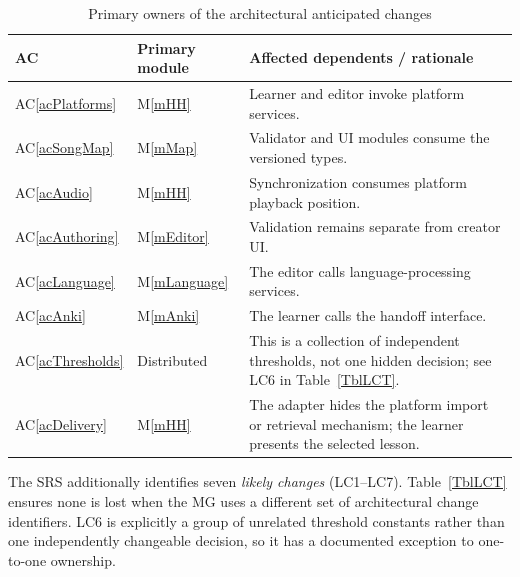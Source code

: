 \documentclass[12pt, titlepage]{article}
\newcommand{\acref}[1]{AC\ref{#1}}
\newcommand{\mref}[1]{M\ref{#1}}
\begin{document}
\begin{table}[H]
\centering
\begin{tabularx}{\textwidth}{@{}l l X@{}}
\toprule
\textbf{AC} & \textbf{Primary module} & \textbf{Affected dependents / rationale}\\
\midrule
\acref{acPlatforms} & \mref{mHH} & Learner and editor invoke platform services.\\
\acref{acSongMap} & \mref{mMap} & Validator and UI modules consume the versioned types.\\
\acref{acAudio} & \mref{mHH} & Synchronization consumes platform playback position.\\
\acref{acAuthoring} & \mref{mEditor} & Validation remains separate from creator UI.\\
\acref{acLanguage} & \mref{mLanguage} & The editor calls language-processing services.\\
\acref{acAnki} & \mref{mAnki} & The learner calls the handoff interface.\\
\acref{acThresholds} & Distributed & This is a collection of independent
  thresholds, not one hidden decision; see LC6 in Table~\ref{TblLCT}.\\
\acref{acDelivery} & \mref{mHH} & The adapter hides the platform import or
  retrieval mechanism; the learner presents the selected lesson.\\
\bottomrule
\end{tabularx}
\caption{Primary owners of the architectural anticipated changes}
\label{TblACT}
\end{table}

The SRS additionally identifies seven \emph{likely changes} (LC1--LC7).
Table~\ref{TblLCT} ensures none is lost when the MG uses a different
set of architectural change identifiers. LC6 is explicitly a group of
unrelated threshold constants rather than one independently changeable
decision, so it has a documented exception to one-to-one ownership.
\end{document}
